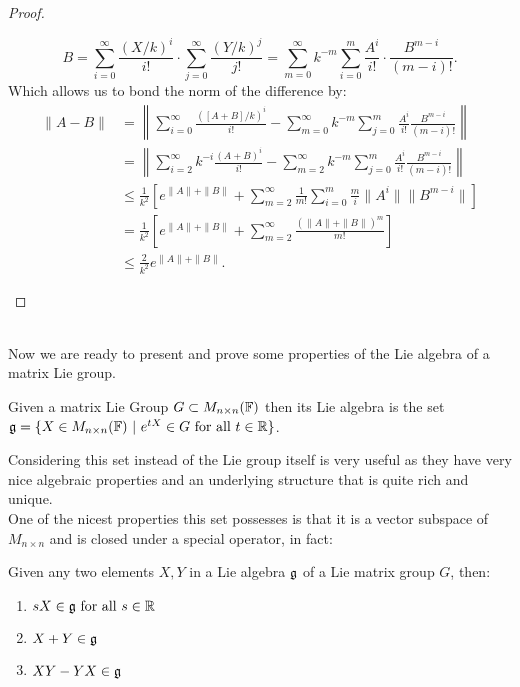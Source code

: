 \begin{proof}
\begin{enumerate}[label=(\alph*)]
		$$B=\sum_{i=0}^\infty \frac{(X/k)^i}{i!}\cdot  \sum_{j=0}^\infty   \frac{(Y/k)^j}{j!}= \sum_{m=0}^\infty k^{-m} \sum_{i=0}^m \frac{A^i}{i!}\cdot \frac{B^{m-i}}{(m-i)!}.$$
		Which allows us to bond the norm of the difference by:
		\begin{align*}
		\|A-B\| &= \left\|\sum_{i=0}^\infty \frac{([A+B]/k)^i}{i!} - \sum_{m=0}^\infty k^{-m} \sum_{j=0}^m \frac{A^i}{i!}\frac{B^{m-i}}{(m-i)!}\right\|\\
		&=\left\|\sum_{i=2}^\infty k^{-i}\frac{(A+B)^i}{i!} - \sum_{m=2}^\infty k^{-m}\sum_{j=0}^m \frac{A^i}{i!}\frac{B^{m-i}}{(m-i)!}\right\|\\
		&\le \frac{1}{k^2}\left[e^{\|A\|+\|B\|}+\sum_{m=2}^\infty \frac{1}{m!}\sum_{i=0}^m \frac{m}{i}\|A^i\| \|B^{m-i}\|\right]\\
		&= \frac{1}{k^2}\left[e^{\|A\|+\|B\|} + \sum_{m=2}^\infty \frac{(\|A\|+\|B\|)^m}{m!}\right]\\
		&\le \frac{2}{k^2}e^{\|A\|+\|B\|}.
		\end{align*}
	\end{enumerate}
\end{proof}\\
Now we are ready to present and prove some properties of the Lie algebra of a matrix Lie group.
\begin{defi}
	Given a matrix Lie Group $G\subset M_{n\times n}(\mathbb{F})$ then its Lie algebra is the set $\mathfrak{g} = \{X \in M_{n\times n}(\mathbb{F})\ |\ e^{tX} \in G \text{ for all } t\in\mathbb{R}\}$.
	\label{LIEALGEBRAFROMMLG}
\end{defi}
Considering this set instead of the Lie group itself is very useful as they have very nice algebraic properties and an underlying structure that is quite rich and unique.\\
One of the nicest properties this set possesses is that it is a vector subspace of $M_{n\times n}$ and is closed under a special operator, in fact:
\begin{prop}
Given any two elements $X,Y$ in a Lie algebra $\mathfrak{g}$ of a Lie matrix group $G$, then:
\begin{enumerate}[label=(\alph*)]
	\item $sX \in \mathfrak{g} \text{ for all } s \in \mathbb{R}$
	\item $X+Y \in \mathfrak{g}$
	\item $XY-YX \in \mathfrak{g}$
\end{enumerate}
\end{prop}
\label{11LieAlgebraAxiomaticDeduction} 
